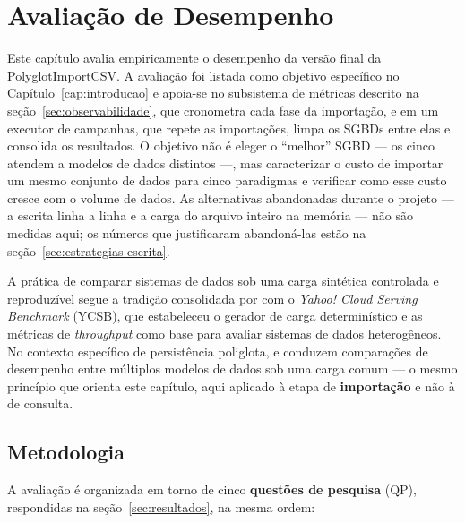 \chapter{Avaliação de Desempenho}
\label{cap:avaliacao}

Este capítulo avalia empiricamente o desempenho da versão final da PolyglotImportCSV. A
avaliação foi listada como objetivo específico no Capítulo~\ref{cap:introducao} e apoia-se
no subsistema de métricas descrito na seção~\ref{sec:observabilidade}, que cronometra cada
fase da importação, e em um executor de campanhas, que repete as importações, limpa os
SGBDs entre elas e consolida os resultados. O objetivo não é eleger o ``melhor'' SGBD ---
os cinco atendem a modelos de dados distintos ---, mas caracterizar o custo de importar um
mesmo conjunto de dados para cinco paradigmas e verificar como esse custo cresce com o
volume de dados. As alternativas abandonadas durante o projeto --- a escrita linha a linha e
a carga do arquivo inteiro na memória --- não são medidas aqui; os números que justificaram
abandoná-las estão na seção~\ref{sec:estrategias-escrita}.

A prática de comparar sistemas de dados sob uma carga sintética controlada e reproduzível
segue a tradição consolidada por  com o \textit{Yahoo!
Cloud Serving Benchmark} (YCSB), que estabeleceu o gerador de carga determinístico e as
métricas de \textit{throughput} como base para avaliar sistemas de dados heterogêneos. No
contexto específico de persistência poliglota,  e
 conduzem comparações de desempenho entre múltiplos modelos de
dados sob uma carga comum --- o mesmo princípio que orienta este capítulo, aqui aplicado à
etapa de \textbf{importação} e não à de consulta.

\section{Metodologia}
\label{sec:metodologia-avaliacao}

A avaliação é organizada em torno de cinco \textbf{questões de pesquisa} (QP), respondidas
na seção~\ref{sec:resultados}, na mesma ordem:


